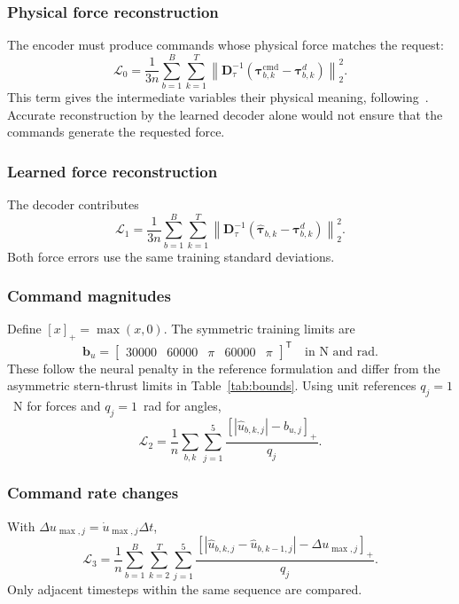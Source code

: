 \documentclass[conference]{IEEEtran}
\newcommand{\pos}[1]{\left[#1\right]_{+}}
\newcommand{\norm}[1]{\left\lVert#1\right\rVert}
\newcommand{\T}{^{\mathsf T}}
\newcommand{\taud}{\bm{\tau}^{d}}
\newcommand{\tauc}{\bm{\tau}^{\mathrm{cmd}}}
\newcommand{\tauh}{\hat{\bm{\tau}}}
\begin{document}
\subsubsection{Physical force reconstruction}
The encoder must produce commands whose physical force matches the request:
\begin{equation}
 \mathcal L_0=\frac{1}{3n}
 \sum_{b=1}^{B}\sum_{k=1}^{T}
 \norm{\bm D_\tau^{-1}
       \left(\tauc_{b,k}-\taud_{b,k}\right)}_2^2.
 \label{eq:L0}
\end{equation}
This term gives the intermediate variables their physical meaning,
following~\cite{Skulstad2023}. Accurate reconstruction by the learned
decoder alone would not ensure that the commands generate the requested force.

\subsubsection{Learned force reconstruction}
The decoder contributes
\begin{equation}
 \mathcal L_1=\frac{1}{3n}
 \sum_{b=1}^{B}\sum_{k=1}^{T}
 \norm{\bm D_\tau^{-1}
       \left(\tauh_{b,k}-\taud_{b,k}\right)}_2^2.
 \label{eq:L1}
\end{equation}
Both force errors use the same training standard deviations.

\subsubsection{Command magnitudes}
Define $[x]_+=\max(x,0)$. The symmetric training limits are
\begin{equation}
 \bm b_u=\begin{bmatrix}30000&60000&\pi&60000&\pi\end{bmatrix}\T
 \quad\text{in N and rad}.
\end{equation}
These follow the neural penalty in the reference formulation and differ
from the asymmetric stern-thrust limits in Table~\ref{tab:bounds}.
Using unit references $q_j=1$~N for forces and $q_j=1$~rad for angles,
\begin{equation}
 \mathcal L_2=\frac{1}{n}\sum_{b,k}\sum_{j=1}^{5}
 \frac{\pos{|\hat u_{b,k,j}|-b_{u,j}}}{q_j}.
 \label{eq:L2}
\end{equation}

\subsubsection{Command rate changes}
With $\Delta u_{\max,j}=\dot u_{\max,j}\Delta t$,
\begin{equation}
 \mathcal L_3=\frac{1}{n}\sum_{b=1}^{B}\sum_{k=2}^{T}\sum_{j=1}^{5}
 \frac{\pos{|\hat u_{b,k,j}-\hat u_{b,k-1,j}|-\Delta u_{\max,j}}}{q_j}.
 \label{eq:L3}
\end{equation}
Only adjacent timesteps within the same sequence are compared.
\end{document}
